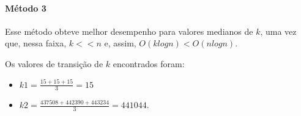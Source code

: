 \documentclass[12pt,a4paper]{article}
\begin{document}
  \paragraph{Método 3}
  Esse método obteve melhor desempenho para valores medianos de $k$, uma vez que, nessa faixa, $k << n$ e, assim, $O(klogn) < O(nlogn)$.

  \pagebreak
  Os valores de transição de $k$ encontrados foram:
  \begin{itemize}
      \item $k1 = \frac{15 + 15 + 15}{3} = 15$
      \item $k2 = \frac{437508 + 442390 + 443234}{3} = 441044$.
  \end{itemize}
\end{document}
